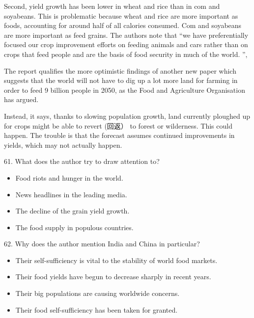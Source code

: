 \documentclass[UTF8,11pt]{ctexart}
\begin{document}
Second, yield growth has been lower in wheat and rice than in com and soyabeans. This is problematic because wheat and rice are more important as foods, accounting for around half of all calories consumed. Com and soyabeans are more important as feed grains. The authors note that “we have preferentially focused our crop improvement efforts on feeding animals and cars rather than on crops that feed people and are the basis of food security in much of the world. ”,


The report qualifies the more optimistic findings of another new paper which suggests that the world will not have to dig up a lot more land for farming in order to feed 9 billion people in 2050, as the Food and Agriculture Organisation has argued.


Instead, it says, thanks to slowing population growth, land currently ploughed up for crops might be able to revert (回返） to forest or wilderness. This could happen. The trouble is that the forecast assumes continued improvements in yields, which may not actually happen.


61. What does the author try to draw attention to?


\begin{itemize}[leftmargin=2em,itemsep=.2em,topsep=.4em]\item[A.] Food riots and hunger in the world.
\item[B.] News headlines in the leading media.
\item[C.] The decline of the grain yield growth.
\item[D.] The food supply in populous countries.
\end{itemize}

62. Why does the author mention India and China in particular?


\begin{itemize}[leftmargin=2em,itemsep=.2em,topsep=.4em]\item[A.] Their self-sufficiency is vital to the stability of world food markets.
\end{itemize}

\begin{itemize}[leftmargin=2em,itemsep=.2em,topsep=.4em]\item[B.] Their food yields have begun to decrease sharply in recent years.
\item[C.] Their big populations are causing worldwide concerns.
\item[D.] Their food self-sufficiency has been taken for granted.
\end{itemize}
\end{document}
